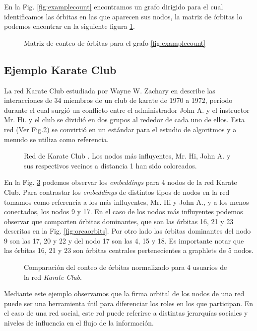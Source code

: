 En la Fig. \ref{fig:examplecount} encontramos un grafo dirigido para el cual identificamos las órbitas en las que aparecen sus nodos, la matriz de órbitas lo podemos encontrar en la siguiente figura \ref{fig:examplecount-vector}.

 \begin{figure}[htbp]
  \centering
  
    \caption{Matriz de conteo de órbitas para el grafo \ref{fig:examplecount}}
    \label{fig:examplecount-vector}
\end{figure}

\subsection{Ejemplo Karate Club}

La red Karate Club estudiada por Wayne W. Zachary en  \cite{zachary_information_1977} describe las interacciones de 34 miembros de un club de karate de 1970 a 1972, periodo durante el cual surgió un conflicto entre el administrador John A. y el instructor Mr. Hi. y el club se dividió en dos grupos al rededor de cada uno de ellos. Esta red (Ver Fig.\ref{fig:karateclub}) se convirtió en un estándar para el estudio de algoritmos y a menudo se utiliza como referencia. 

 \begin{figure}[htbp]
  \centering
  
    \caption{Red de Karate Club \cite{zachary_information_1977}. Los nodos más influyentes, Mr. Hi, John A. y sus respectivos vecinos a distancia 1 han sido coloreados.}
    \label{fig:karateclub}
\end{figure}

En la Fig. \ref{fig:karateorbits} podemos observar los \textit{embeddings} para 4 nodos de la red Karate Club. Para contrastar los \textit{embeddings} de distintos tipos de nodos en la red tomamos como referencia a los más influyentes, Mr. Hi y John A., y a los menos conectados, los nodos 9 y 17. En el caso de los nodos más influyentes podemos observar que comparten órbitas dominantes, que son las órbitas 16, 21 y 23 descritas en la Fig. \ref{fig:orcaorbits}. Por otro lado las órbitas dominantes del nodo 9 son las 17, 20 y 22 y del nodo 17 son las 4, 15 y 18. Es importante notar que las órbitas 16, 21 y 23 son órbitas centrales pertenecientes a graphlets de 5 nodos.

 \begin{figure}[htbp]
   \centering
   
    \caption{Comparación del conteo de órbitas normalizado para 4 usuarios de la red \textit{Karate Club}.}
    \label{fig:karateorbits}
\end{figure}

Mediante este ejemplo observamos que la firma orbital de los nodos de una red puede ser una herramienta útil para diferenciar los roles en los que participan. En el caso de una red social, este rol puede referirse a distintas jerarquías sociales y niveles de influencia en el flujo de la información.